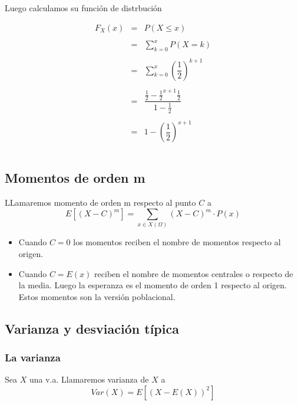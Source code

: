 \documentclass[
]{article}
\begin{document}
Luego calculamos su función de distrbución

\[\begin{array}{rcl}
  F_X(x)&=&P(X\leq x)\\\\
  &=&\sum\limits_{k=0}^x P(X=k)\\\\
  &=&\sum\limits_{k=0}^x \left(\dfrac{1}{2}\right)^{k+1}\\\\
  &=&\dfrac{\frac{1}{2}-\frac{1}{2}^{x+1} \frac{1}{2} }{1-\frac{1}{2} }\\\\
  &=&1-\left(\dfrac{1}{2}\right)^{x+1}\\\\
\end{array}\]

\hypertarget{momentos-de-orden-m}{%
\subsection{Momentos de orden m}\label{momentos-de-orden-m}}

LLamaremos momento de orden m respecto al punto \(C\) a
\[E\left[(X-C)^m\right] = \sum_{x\in X(\Omega)} (X-C)^m\cdot 
  P(x)\]

\begin{itemize}
  \item Cuando $C=0$ los momentos reciben el nombre de momentos respecto al origen.
  \item Cuando $C=E(x)$ reciben el nombre de momentos centrales o respecto de la media. Luego la esperanza es el momento de orden 1 respecto al origen. Estos momentos son la versión poblacional.
\end{itemize}

\hypertarget{varianza-y-desviaciuxf3n-tuxedpica}{%
\subsection{Varianza y desviación
típica}\label{varianza-y-desviaciuxf3n-tuxedpica}}

\hypertarget{la-varianza}{%
\subsubsection{La varianza}\label{la-varianza}}

Sea \(X\) una v.a. Llamaremos varianza de \(X\) a
\[Var(X) = E\left[(X-E(X))^2\right]\]
\end{document}
